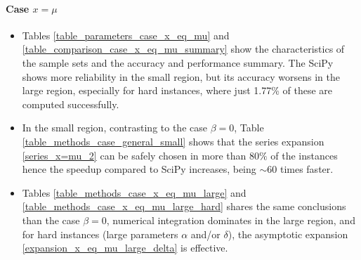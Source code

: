 \documentclass[10pt,a4paper,oneside]{article}
\numberwithin{equation}{section}
\begin{document}
\paragraph{Case $x = \mu$}
\begin{itemize}
\item Tables \ref{table_parameters_case_x_eq_mu} and \ref{table_comparison_case_x_eq_mu_summary} show the characteristics of the sample sets and the accuracy and performance summary. The SciPy shows more reliability in the small region, but its accuracy worsens in the large region, especially for hard instances, where just 1.77\% of these are computed successfully.
\item In the small region, contrasting to the case $\beta = 0$, Table \ref{table_methods_case_general_small} shows that the series expansion \eqref{series_x=mu_2} can be safely chosen in more than $80\%$ of the instances hence the speedup compared to SciPy increases, being $\sim 60$ times faster.
\item Tables \ref{table_methods_case_x_eq_mu_large} and \ref{table_methods_case_x_eq_mu_large_hard} shares the same conclusions than the case $\beta = 0$, numerical integration dominates in the large region, and for hard instances (large parameters $\alpha$ and/or $\delta$), the asymptotic expansion \eqref{expansion_x_eq_mu_large_delta} is effective.
\end{itemize}
\end{document}
